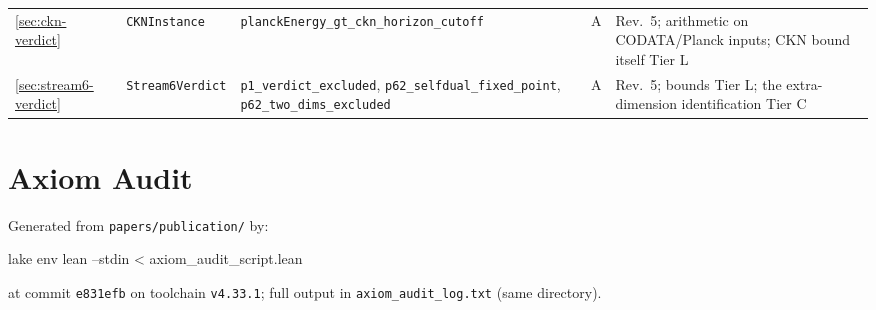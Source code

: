 \documentclass[11pt,a4paper]{article}
\theoremstyle{remark}
\begin{document}
\begin{center}
\begin{tabular}{@{}l l >{\raggedright\arraybackslash}p{4.4cm} l >{\raggedright\arraybackslash}p{4.0cm}@{}}
\ref{sec:ckn-verdict} & \texttt{CKNInstance} & \texttt{planckEnergy\_\discretionary{}{}{}gt\_\discretionary{}{}{}ckn\_\discretionary{}{}{}horizon\_\discretionary{}{}{}cutoff} & A & Rev.~5; arithmetic on CODATA/Planck inputs; CKN bound itself Tier L \\
\ref{sec:stream6-verdict} & \texttt{Stream6Verdict} & \texttt{p1\_\discretionary{}{}{}verdict\_\discretionary{}{}{}excluded}, \texttt{p62\_\discretionary{}{}{}selfdual\_\discretionary{}{}{}fixed\_\discretionary{}{}{}point}, \texttt{p62\_\discretionary{}{}{}two\_\discretionary{}{}{}dims\_\discretionary{}{}{}excluded} & A & Rev.~5; bounds Tier L; the extra-dimension identification Tier C \\
\bottomrule
\end{tabular}
\end{center}

\section{Axiom Audit}
\label{app:axioms}

Generated from \texttt{papers/publication/} by:
\begin{center}
\footnotesize\ttfamily
lake env lean --stdin < axiom\_audit\_script.lean
\end{center}
at commit \texttt{e831efb} on toolchain \texttt{v4.33.1}; full output in
\texttt{axiom\_audit\_log.txt} (same directory).
\end{document}

